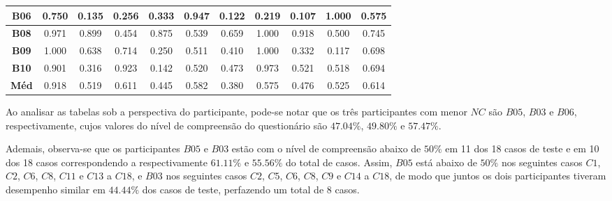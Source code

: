 \begin{table}[htbp]
\begin{tabular}{|c|ccccccccc|c|}
		\textbf{B06} & \multicolumn{1}{c|}{0.750} & \multicolumn{1}{c|}{0.135} & \multicolumn{1}{c|}{0.256} & \multicolumn{1}{c|}{0.333} & \multicolumn{1}{c|}{0.947} & \multicolumn{1}{c|}{0.122} & \multicolumn{1}{c|}{0.219} & \multicolumn{1}{c|}{0.107} & 1.000 & 0.575 \\ \hline
		\rowcolor[HTML]{F2F2F2} 
		\textbf{B08} & \multicolumn{1}{c|}{\cellcolor[HTML]{F2F2F2}0.971} & \multicolumn{1}{c|}{\cellcolor[HTML]{F2F2F2}0.899} & \multicolumn{1}{c|}{\cellcolor[HTML]{F2F2F2}0.454} & \multicolumn{1}{c|}{\cellcolor[HTML]{F2F2F2}0.875} & \multicolumn{1}{c|}{\cellcolor[HTML]{F2F2F2}0.539} & \multicolumn{1}{c|}{\cellcolor[HTML]{F2F2F2}0.659} & \multicolumn{1}{c|}{\cellcolor[HTML]{F2F2F2}1.000} & \multicolumn{1}{c|}{\cellcolor[HTML]{F2F2F2}0.918} & 0.500 & 0.745 \\ \hline
		\textbf{B09} & \multicolumn{1}{c|}{1.000} & \multicolumn{1}{c|}{0.638} & \multicolumn{1}{c|}{0.714} & \multicolumn{1}{c|}{0.250} & \multicolumn{1}{c|}{0.511} & \multicolumn{1}{c|}{0.410} & \multicolumn{1}{c|}{1.000} & \multicolumn{1}{c|}{0.332} & 0.117 & 0.698 \\ \hline
		\rowcolor[HTML]{F2F2F2} 
		\textbf{B10} & \multicolumn{1}{c|}{\cellcolor[HTML]{F2F2F2}0.901} & \multicolumn{1}{c|}{\cellcolor[HTML]{F2F2F2}0.316} & \multicolumn{1}{c|}{\cellcolor[HTML]{F2F2F2}0.923} & \multicolumn{1}{c|}{\cellcolor[HTML]{F2F2F2}0.142} & \multicolumn{1}{c|}{\cellcolor[HTML]{F2F2F2}0.520} & \multicolumn{1}{c|}{\cellcolor[HTML]{F2F2F2}0.473} & \multicolumn{1}{c|}{\cellcolor[HTML]{F2F2F2}0.973} & \multicolumn{1}{c|}{\cellcolor[HTML]{F2F2F2}0.521} & 0.518 & 0.694 \\ \hline
		\textbf{Méd} & \multicolumn{1}{c|}{0.918} & \multicolumn{1}{c|}{0.519} & \multicolumn{1}{c|}{0.611} & \multicolumn{1}{c|}{0.445} & \multicolumn{1}{c|}{0.582} & \multicolumn{1}{c|}{0.380} & \multicolumn{1}{c|}{0.575} & \multicolumn{1}{c|}{0.476} & 0.525 & 0.614 \\ \hline
	\end{tabular}
	\label{tab:F3_A2_NCQ_EF1_2}
\end{table}

Ao analisar as tabelas sob a perspectiva do participante, pode-se notar que os três participantes com menor $NC$ são $B05$, $B03$ e $B06$, respectivamente, cujos valores do nível de compreensão do questionário são $47.04\%$, $49.80\%$ e $57.47\%$.

Ademais, observa-se que os participantes $B05$ e $B03$ estão com o nível de compreensão abaixo de $50\%$ em 11 dos 18 casos de teste e em 10 dos 18 casos correspondendo a respectivamente $61.11\%$ e $55.56\%$ do total de casos. Assim, $B05$ está abaixo de $50\%$ nos seguintes casos $C1$, $C2$, $C6$, $C8$, $C11$ e $C13$ a $C18$, e $B03$ nos seguintes casos $C2$, $C5$, $C6$, $C8$, $C9$ e $C14$ a $C18$, de modo que juntos os dois participantes tiveram desempenho similar em $44.44\%$ dos casos de teste, perfazendo um total de 8 casos.


